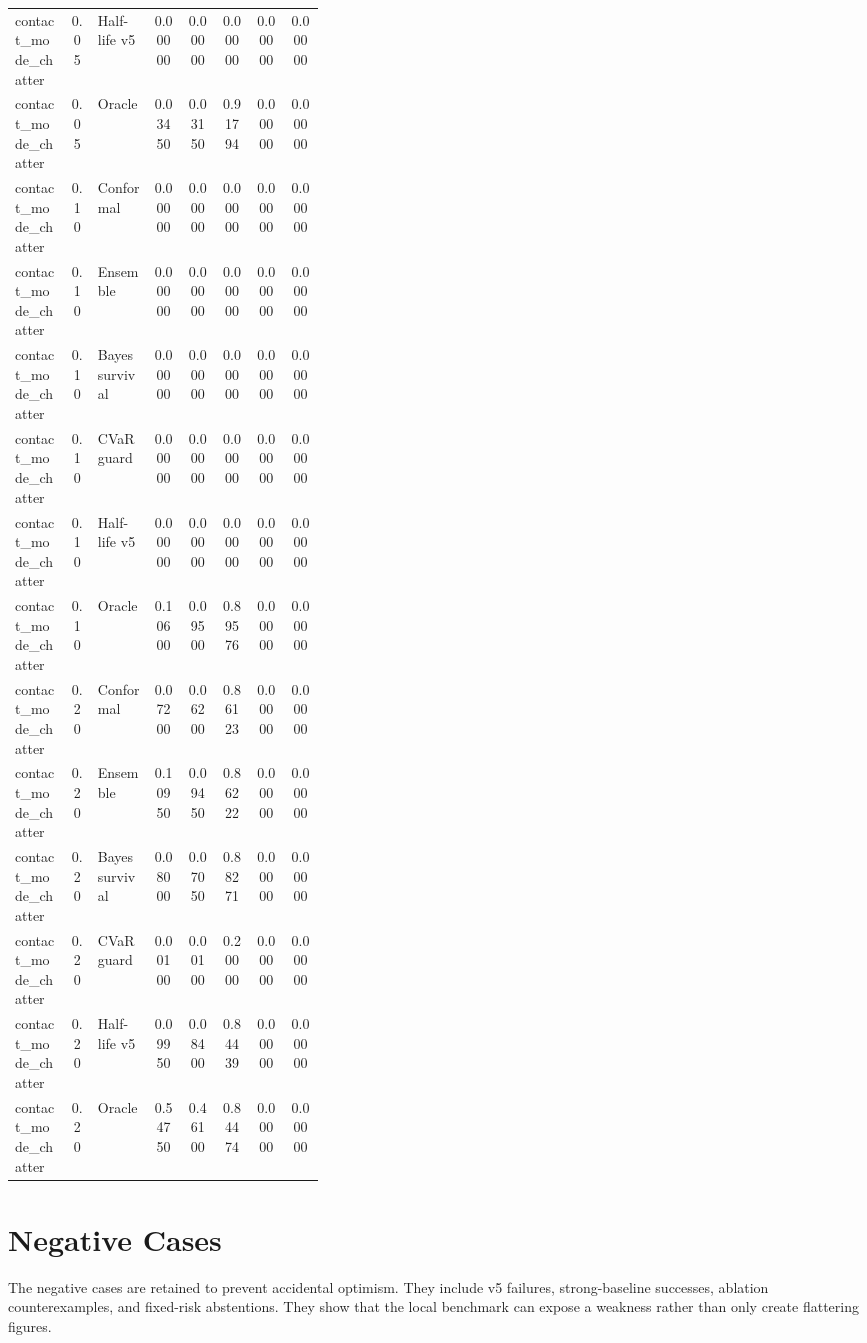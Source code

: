 \documentclass{article}
\begin{document}
\begin{center}
\begin{longtable}{p{0.18\linewidth}cp{0.18\linewidth}ccccc}
contact\_mode\_chatter & 0.05 & Half-life v5 & 0.00000 & 0.00000 & 0.00000 & 0.00000 & 0.00000\\
contact\_mode\_chatter & 0.05 & Oracle & 0.03450 & 0.03150 & 0.91794 & 0.00000 & 0.00000\\
contact\_mode\_chatter & 0.10 & Conformal & 0.00000 & 0.00000 & 0.00000 & 0.00000 & 0.00000\\
contact\_mode\_chatter & 0.10 & Ensemble & 0.00000 & 0.00000 & 0.00000 & 0.00000 & 0.00000\\
contact\_mode\_chatter & 0.10 & Bayes survival & 0.00000 & 0.00000 & 0.00000 & 0.00000 & 0.00000\\
contact\_mode\_chatter & 0.10 & CVaR guard & 0.00000 & 0.00000 & 0.00000 & 0.00000 & 0.00000\\
contact\_mode\_chatter & 0.10 & Half-life v5 & 0.00000 & 0.00000 & 0.00000 & 0.00000 & 0.00000\\
contact\_mode\_chatter & 0.10 & Oracle & 0.10600 & 0.09500 & 0.89576 & 0.00000 & 0.00000\\
contact\_mode\_chatter & 0.20 & Conformal & 0.07200 & 0.06200 & 0.86123 & 0.00000 & 0.00000\\
contact\_mode\_chatter & 0.20 & Ensemble & 0.10950 & 0.09450 & 0.86222 & 0.00000 & 0.00000\\
contact\_mode\_chatter & 0.20 & Bayes survival & 0.08000 & 0.07050 & 0.88271 & 0.00000 & 0.00000\\
contact\_mode\_chatter & 0.20 & CVaR guard & 0.00100 & 0.00100 & 0.20000 & 0.00000 & 0.00000\\
contact\_mode\_chatter & 0.20 & Half-life v5 & 0.09950 & 0.08400 & 0.84439 & 0.00000 & 0.00000\\
contact\_mode\_chatter & 0.20 & Oracle & 0.54750 & 0.46100 & 0.84474 & 0.00000 & 0.00000\\
\bottomrule
\end{longtable}
\normalsize
\end{center}

\section{Negative Cases}

The negative cases are retained to prevent accidental optimism. They include v5 failures, strong-baseline successes, ablation counterexamples, and fixed-risk abstentions. They show that the local benchmark can expose a weakness rather than only create flattering figures.
\end{document}
